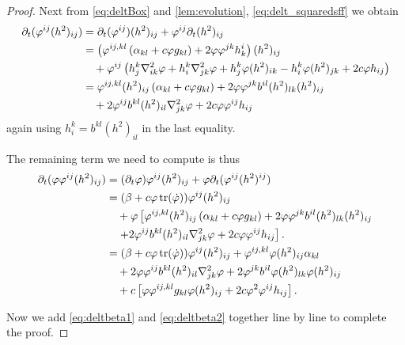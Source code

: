 \documentclass{amsart}
\begin{document}
\begin{proof}
Next from \cref{eq:deltBox} and \cref{lem:evolution}, \cref{eq:delt_squaredsff} we obtain
\[
\begin{split}
\partial_{t} (\varphi^{ij}(h^2)_{ij}) &= \partial_{t}(\varphi^{ij}) (h^2)_{ij} + \varphi^{ij} \partial_t (h^2)_{ij} \\
&= \left(\varphi^{ij,kl} \left(\alpha_{kl} + c \varphi g_{kl}\right) + 2\varphi\varphi^{jk}h^{i}_{k}\right) (h^2)_{ij} \\
&\quad + \varphi^{ij} \left(h^k_j \nabla^2_{i
k} \varphi + h^k_i \nabla^2_{jk} \varphi + h^k_j \varphi(h^2)_{ik} - h^k_i \varphi(h^2)_{jk} + 2c\varphi h_{ij}\right) \\
&= \varphi^{ij,kl} (h^2)_{ij} \left(\alpha_{kl} + c \varphi g_{kl}\right) + 2\varphi\varphi^{jk} b^{il} (h^2)_{lk} (h^2)_{ij} \\
&\quad + 2 \varphi^{ij} b^{kl} (h^2)_{il} \nabla^2_{jk} \varphi  + 2c\varphi\varphi^{ij}h_{ij}
\end{split}
\]
again using \(h^k_i = b^{kl} (h^2)_{il}\) in the last equality.

The remaining term we need to compute is thus
\begin{equation}
\label{eq:deltbeta2}
\begin{split}
\partial_{t} (\varphi \varphi^{ij}(h^2)_{ij}) &= (\partial_{t} \varphi) \varphi^{ij}(h^2)_{ij} + \varphi \partial_t (\varphi^{ij} (h^2)^{ij}) \\
&= (\beta + c \varphi\operatorname{tr}(\dot{\varphi})) \varphi^{ij}(h^2)_{ij} \\
&\quad + \varphi \left[\varphi^{ij,kl} (h^2)_{ij} \left(\alpha_{kl} + c \varphi g_{kl}\right) + 2\varphi\varphi^{jk} b^{il} (h^2)_{lk} (h^2)_{ij} \right.\\
&\quad \left. + 2 \varphi^{ij} b^{kl} (h^2)_{il} \nabla^2_{jk} \varphi  + 2c\varphi\varphi^{ij}h_{ij}\right]. \\
&= (\beta + c \varphi\operatorname{tr}(\dot{\varphi})) \varphi^{ij}(h^2)_{ij} + \varphi^{ij,kl} \varphi (h^2)_{ij} \alpha_{kl}  \\
&\quad + 2 \varphi\varphi^{ij} b^{kl} (h^2)_{il} \nabla^2_{jk} \varphi + 2\varphi^{jk} b^{il} \varphi (h^2)_{lk} \varphi (h^2)_{ij} \\
&\quad + c \left[\varphi \varphi^{ij,kl} g_{kl} \varphi (h^2)_{ij} + 2c\varphi^2\varphi^{ij}h_{ij}\right].
\end{split}
\end{equation}

Now we add \cref{eq:deltbeta1} and \cref{eq:deltbeta2} together line by line to complete the proof.
\end{proof}
\end{document}
